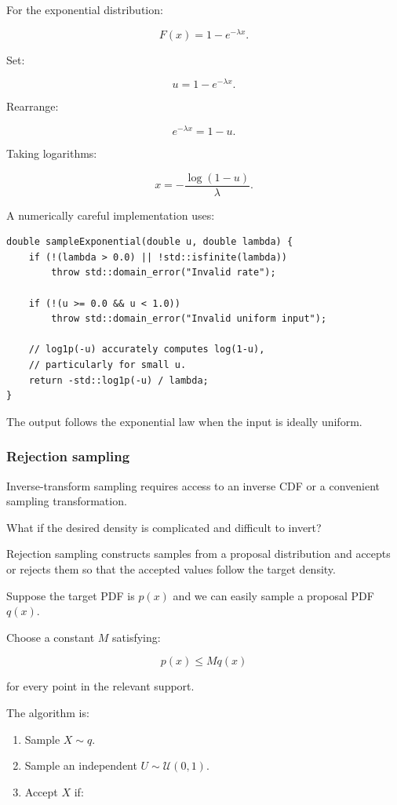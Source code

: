 For the exponential distribution:

\[
 F(x)=1-e^{-\lambda x}.
\]

Set:

\[
 u=1-e^{-\lambda x}.
\]

Rearrange:

\[
 e^{-\lambda x}=1-u.
\]

Taking logarithms:

\[
 \boxed{ x=-\frac{\log(1-u)}{\lambda} }.
\]

A numerically careful implementation uses:

\begin{verbatim}
double sampleExponential(double u, double lambda) {
    if (!(lambda > 0.0) || !std::isfinite(lambda))
        throw std::domain_error("Invalid rate");

    if (!(u >= 0.0 && u < 1.0))
        throw std::domain_error("Invalid uniform input");

    // log1p(-u) accurately computes log(1-u),
    // particularly for small u.
    return -std::log1p(-u) / lambda;
}
\end{verbatim}

The output follows the exponential law when the input is ideally uniform.

\subsubsection{Rejection sampling}\label{rejection-sampling}

Inverse-transform sampling requires access to an inverse CDF or a convenient sampling transformation.

What if the desired density is complicated and difficult to invert?

Rejection sampling constructs samples from a proposal distribution and accepts or rejects them so that the accepted values follow the target density.

Suppose the target PDF is \(p(x)\) and we can easily sample a proposal PDF \(q(x)\).

Choose a constant \(M\) satisfying:

\[
 \boxed{ p(x)\le Mq(x) }
\]

for every point in the relevant support.

The algorithm is:

\begin{enumerate}
\def\labelenumi{\arabic{enumi}.}
\tightlist
\item
  Sample \(X\sim q\).
\item
  Sample an independent \(U\sim\mathcal U(0,1)\).
\item
  Accept \(X\) if:
\end{enumerate}

